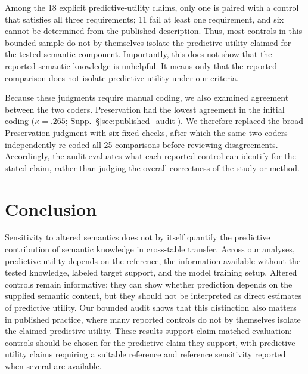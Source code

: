 \documentclass{article} %
\newcommand{\supp}[1]{\textnormal{Supp.~#1}}
\begin{document}
Among the 18 explicit predictive-utility claims, only one is paired with a control that satisfies all three requirements; 11 fail at least one requirement, and six cannot be determined from the published description.
Thus, most controls in this bounded sample do not by themselves isolate the predictive utility claimed for the tested semantic component.
Importantly, this does not show that the reported semantic knowledge is unhelpful.
It means only that the reported comparison does not isolate predictive utility under our criteria.

Because these judgments require manual coding, we also examined agreement between the two coders.
Preservation had the lowest agreement in the initial coding ($\kappa=.265$; \supp{\S\ref{sec:published_audit}}).
We therefore replaced the broad Preservation judgment with six fixed checks, after which the same two coders independently re-coded all 25 comparisons before reviewing disagreements.
Accordingly, the audit evaluates what each reported control can identify for the stated claim, rather than judging the overall correctness of the study or method.

\section{Conclusion}

Sensitivity to altered semantics does not by itself quantify the predictive contribution of semantic knowledge in cross-table transfer.
Across our analyses, predictive utility depends on the reference, the information available without the tested knowledge, labeled target support, and the model training setup.
Altered controls remain informative: they can show whether prediction depends on the supplied semantic content, but they should not be interpreted as direct estimates of predictive utility.
Our bounded audit shows that this distinction also matters in published practice, where many reported controls do not by themselves isolate the claimed predictive utility.
These results support claim-matched evaluation: controls should be chosen for the predictive claim they support, with predictive-utility claims requiring a suitable reference and reference sensitivity reported when several are available.
\end{document}
